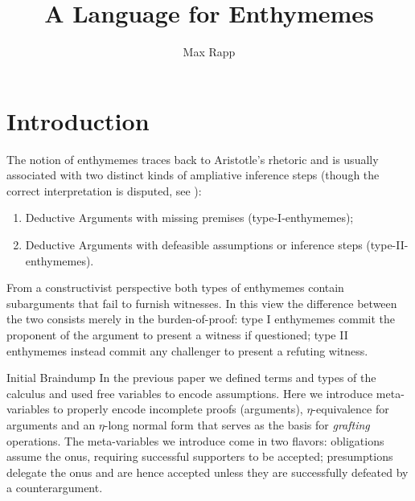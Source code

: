 \documentclass{article}
\title{A Language for Enthymemes}
\author{Max Rapp}
\begin{document}
\maketitle

\section{Introduction}

The notion of enthymemes traces back to Aristotle's rhetoric and is usually associated with two distinct kinds of ampliative inference steps (though the correct interpretation is disputed, see \cite{sep-aristotle-rhetoric}):

\begin{enumerate}
\item Deductive Arguments with missing premises (type-I-enthymemes);
\item Deductive Arguments with defeasible assumptions or inference steps (type-II-enthymemes).
\end{enumerate}

From a constructivist perspective both types of enthymemes contain subarguments that fail to furnish witnesses.
In this view the difference between the two consists merely in the burden-of-proof: type I enthymemes commit the proponent of the argument to present a witness if questioned; type II enthymemes instead commit any challenger to present a refuting witness.

\begin{oldpart}{Initial Braindump}
  In the previous paper we defined terms and types of the \matilda calculus and used free variables to encode assumptions.
  Here we introduce meta-variables to properly encode incomplete proofs (arguments), $\eta$-equivalence for arguments and an $\eta$-long normal form that serves as the basis for \emph{grafting} operations.
  The meta-variables we introduce come in two flavors: obligations assume the onus, requiring successful supporters to be accepted; presumptions delegate the onus and are hence accepted unless they are successfully defeated by a counterargument.


  
\end{oldpart}
\end{document}
